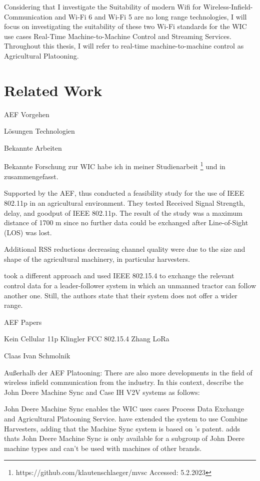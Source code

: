 Considering that I investigate the Suitability of modern Wifi for Wireless-Infield-Communication and Wi-Fi 6 and Wi-Fi 5 are no long range technologies, I will focus on investigating the suitability of these two Wi-Fi standards for the \ac{WIC} use cases Real-Time Machine-to-Machine Control and Streaming Services. Throughout this thesis, I will refer to real-time machine-to-machine control as Agricultural Platooning.
\section{Related Work}
AEF Vorgehen

Lösungen
Technologien

Bekannte Arbeiten 



Bekannte Forschung zur WIC habe ich in meiner Studienarbeit \footnote{https://github.com/klautenschlaeger/mvsc Accessed: 5.2.2023} und in \cite{Beyond} zusammengefasst. 

Supported by the \ac{AEF}, \textcite{klingler} thus
conducted a feasibility study for the use of IEEE 802.11p in an agricultural environment. They tested Received Signal Strength, delay, and goodput of IEEE 802.11p. The result of the study was a maximum distance of 1700 m since no further
data could be exchanged after Line-of-Sight (LOS) was lost.

Additional RSS reductions decreasing channel quality were
due to the size and shape of the agricultural machinery, in
particular harvesters.

\cite{FendtPlatoon} took a different approach
and used IEEE 802.15.4 to exchange the relevant control data
for a leader-follower system in which an unmanned tractor can follow another one. Still, the authors state that their system does not offer a wider range.


AEF Papers

Kein Cellular
11p Klingler
FCC
802.15.4 Zhang
LoRa


Claas Ivan Schmolnik






Außerhalb der AEF Platooning:
There are also more developments in the field of wireless infield communication from the industry. In this context, \textcite{thomasson_review_2018} describe the John Deere Machine Sync and Case IH V2V systems as follows:

John Deere Machine Sync enables the \ac{WIC} uses cases Process Data Exchange and Agricultural Platooning Service. \textcite{liu_automation_2022} have extended the system to use Combine Harvesters, adding that the Machine Sync system is based on \textcite{metzler_system_2006}'s patent.
\textcite{smolnik_5g_2020} adds thats John Deere Machine Sync is only available for a subgroup of John Deere machine types and can't be used with machines of other brands.

